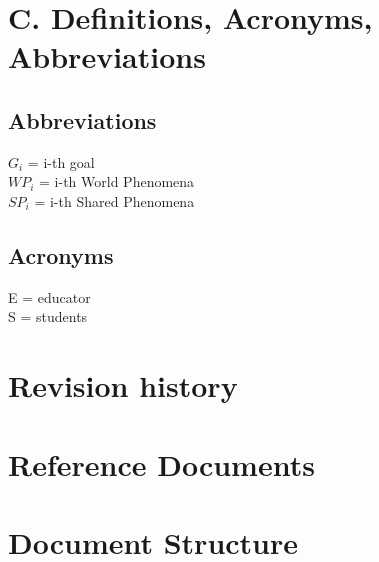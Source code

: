 \section{C. Definitions, Acronyms, Abbreviations}
\subsection{Abbreviations}
\(G_i\) = i-th goal \\
\(WP_i\) = i-th World Phenomena\\
\(SP_i\) = i-th Shared Phenomena\\

\subsection{Acronyms}
E = educator \\
S = students
\section{Revision history}
\section{Reference Documents}
\section{Document Structure}
{\color{red}{I think that this section is not needed}}